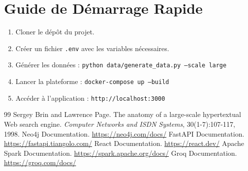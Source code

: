 \documentclass[12pt,a4paper]{report}
\begin{document}
\appendix

\newpage
\chapter{Guide de Démarrage Rapide}
\begin{enumerate}
  \item Cloner le dépôt du projet.
  \item Créer un fichier \texttt{.env} avec les variables nécessaires.
  \item Générer les données : \texttt{python data/generate\_data.py --scale large}
  \item Lancer la plateforme : \texttt{docker-compose up --build}
  \item Accéder à l'application : \texttt{http://localhost:3000}
\end{enumerate}

\newpage
\renewcommand{\bibname}{Bibliographie et Webographie}
\begin{thebibliography}{99}
 Sergey Brin and Lawrence Page. The anatomy of a large-scale hypertextual Web search engine. \emph{Computer Networks and ISDN Systems}, 30(1-7):107-117, 1998.
 Neo4j Documentation. \url{https://neo4j.com/docs/}
 FastAPI Documentation. \url{https://fastapi.tiangolo.com/}
 React Documentation. \url{https://react.dev/}
 Apache Spark Documentation. \url{https://spark.apache.org/docs/}
 Groq Documentation. \url{https://groq.com/docs/}
\end{thebibliography}

\newpage
\end{document}
